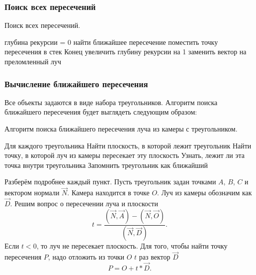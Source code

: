 \documentclass[14pt,a4paper]{extarticle}
\begin{document}
    	\subsubsection*{Поиск всех пересечений}
    		\begin{algorithm}[H]
    			\caption{Поиск всех пересечений.}
    			\begin{algorithmic}[1]
    				\BeginAlgorithm
    				\State глубина рекурсии = 0
    				\State	найти ближайшее пересечение
    				\State поместить точку пересечения в стек
    				\State Конец
    				\State увеличить глубину рекурсии на 1
    				\State заменить вектор на преломленный луч
    				\EndIf
    				\EndIf
    				\EndIf
    				\EndWhile
    				\EndAlgorithm	
    			\end{algorithmic}
    		\end{algorithm}
    		
    	\subsubsection*{Вычисление ближайшего пересечения}
    		Все объекты задаются в виде набора треугольников. Алгоритм поиска ближайшего пересечения будет выглядеть следующим образом:
    		
    		\begin{algorithm}
    			\caption{Алгоритм поиска ближайшего пересечения луча из камеры с треугольником.}
    			\begin{algorithmic}[1]
    				\BeginAlgorithm
    				\State Для каждого треугольника
    					\State Найти плоскость, в которой лежит треугольник
    					\State Найти точку, в которой луч из камеры пересекает эту плоскость
    					\State Узнать, лежит ли эта точка внутри треугольника
    						\State Запомнить треугольник как ближайший
    					\EndIf
    				\EndAlgorithm
    			\end{algorithmic}
    		\end{algorithm}
    	
    		Разберём подробнее каждый пункт.
    		Пусть треугольник задан точками $A$, $B$, $C$ и вектором нормали $\vec{N}$. 
    		Камера находится в точке $O$. 
    		Луч из камеры обозначим как $\vec{D}$.
    		Решим вопрос о пересечении луча и плоскости
    		\begin{equation*}
    		t = \frac{(\vec{N},\vec{A})-(\vec{N},\vec{O})}{(\vec{N},\vec{D})}.
    		\end{equation*}
    		Если $t<0$, то луч не пересекает плоскость.
    		Для того, чтобы найти точку пересечения $P$, надо отложить из точки $O$ $t$ раз вектор $\vec{D}$
    		\begin{equation*}
    			P = O + t*\vec{D}. 		
    		\end{equation*}
    		
\end{document}

